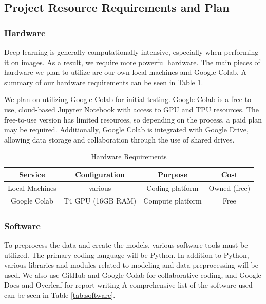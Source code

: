 \documentclass[stu,12pt,floatsintext]{apa7}
\begin{document}
\subsection{Project Resource Requirements and Plan}
\subsubsection{Hardware}
Deep learning is generally computationally intensive, especially when performing it on images. As a result, we require more powerful hardware. The main pieces of hardware we plan to utilize are our own local machines and Google Colab. A summary of our hardware requirements can be seen in Table \ref{tab:hardware}.

We plan on utilizing Google Colab for initial testing. Google Colab is a free-to-use, cloud-based Jupyter Notebook with access to GPU and TPU resources. The free-to-use version has limited resources, so depending on the process, a paid plan may be required. Additionally, Google Colab is integrated with Google Drive, allowing data storage and collaboration through the use of shared drives.

\begin{table}[!htb]
	\centering
	\caption{Hardware Requirements}
	\begin{tabular}{cccc}
		\hline
		Service        & Configuration     & Purpose          & Cost         \\
		\hline
		Local Machines & various           & Coding platform  & Owned (free) \\
		Google Colab   & T4 GPU (16GB RAM) & Compute platform & Free         \\
		\hline
	\end{tabular}
	\label{tab:hardware}
\end{table}

\subsubsection{Software}
To preprocess the data and create the models, various software tools must be utilized. The primary coding language will be Python. In addition to Python, various libraries and modules related to modeling and data preprocessing will be used. We also use GitHub and Google Colab for collaborative coding, and Google Docs and Overleaf for report writing A comprehensive list of the software used can be seen in Table \ref{tab:software}.
\end{document}
